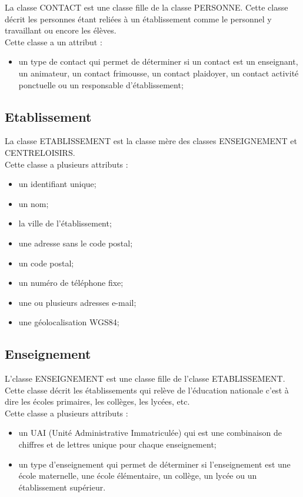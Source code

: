 \documentclass[asi, sansVersion]{picInsa}
\begin{document}
La classe CONTACT est une classe fille de la classe PERSONNE. Cette classe décrit les personnes étant reliées à un établissement comme le personnel y travaillant ou encore les élèves. \\
Cette classe a un attribut : 
\begin{itemize}
\item un type de contact qui permet de déterminer si un contact est un enseignant, un animateur, un contact frimousse, un contact plaidoyer, un contact activité ponctuelle ou un responsable d'établissement; 
\end{itemize} 


\subsection*{Etablissement}

La classe ETABLISSEMENT est la classe mère des classes ENSEIGNEMENT et CENTRELOISIRS. \\
Cette classe a plusieurs attributs : 
\begin{itemize}
\item un identifiant unique;
\item un nom;
\item la ville de l'établissement;
\item une adresse sans le code postal;
\item un code postal;
\item un numéro de téléphone fixe;
\item une ou plusieurs adresses e-mail; %
\item une géolocalisation WGS84; %
\end{itemize}

\subsection*{Enseignement}
L'classe ENSEIGNEMENT est une classe fille de l'classe ETABLISSEMENT. Cette classe décrit les établissements qui relève de l'éducation nationale c'est à dire les écoles primaires, les collèges, les lycées, etc. \\
Cette classe a plusieurs attributs : 
\begin{itemize}
\item un UAI (Unité Administrative Immatriculée) qui est une combinaison de chiffres et de lettres unique pour chaque enseignement;
\item un type d'enseignement qui permet de déterminer si l'enseignement est une école maternelle, une école élémentaire, un collège, un lycée ou un établissement supérieur. 
\end{itemize} 
\end{document}
